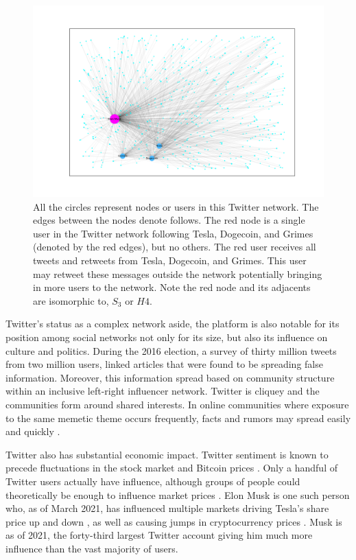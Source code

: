 \begin{figure}
    \includegraphics[width=15cm]{Images/elon_graph.png}
    \centering
    \caption{All the circles represent nodes or users in this Twitter network. The edges between the nodes denote follows.
     The red node is a single user in the Twitter network following Tesla, Dogecoin, and Grimes (denoted by the red edges), but no others. The 
    red user receives all tweets and retweets from Tesla, Dogecoin, and Grimes. This user may retweet these messages
    outside the network potentially bringing in more users to the network. Note the red node and its adjacents are isomorphic to, $S_3$ or $H4$.}
\end{figure}


Twitter's status as a complex network aside, the platform is also notable for its position among social networks not only for its size,
but also its influence on culture and politics. During the 2016 election, a survey of
thirty million tweets from two million users, linked articles that were found to be spreading
false information. Moreover, this information spread based on community structure within an inclusive left-right
influencer network. Twitter is cliquey and the communities form around 
shared interests. In online communities where exposure to the same memetic theme occurs frequently, 
facts and rumors may spread easily and quickly \cite{bessi}.

Twitter also has substantial economic impact. Twitter sentiment is known to precede fluctuations
in the stock market \cite{Bollen2011} and Bitcoin prices \cite{bitcoin}. Only a handful of Twitter users actually have influence, 
although groups of people could theoretically be enough to influence market prices \cite{stonks}.
Elon Musk is one such person who, as of March 2021, has influenced multiple markets driving Tesla's share
price up and down \cite{elontweet}, as well as causing jumps in cryptocurrency prices  \cite{elontweet2} \cite{dogecoin}. Musk 
is as of 2021, the forty-third largest Twitter account giving him much more influence than the vast majority of users.

